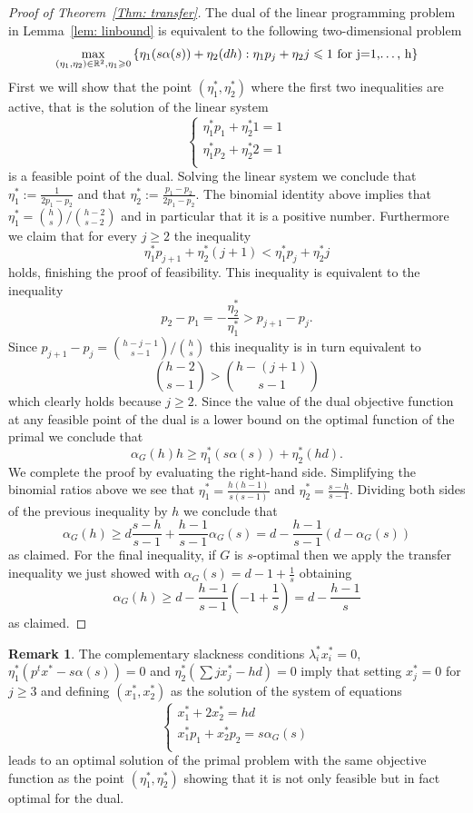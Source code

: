 \documentclass[12pt]{amsart}
\theoremstyle{definition}
\newtheorem{remark}[lemma]{Remark}
\renewcommand{\geq}{\geqslant}
\renewcommand{\leq}{\leqslant}
\newcommand{\RR}{\ensuremath{\mathbb{R}}}
\newcommand{\1}{\ensuremath{\mathbb{1}}}
\begin{document}
\begin{proof}[Proof of Theorem~\ref{Thm: transfer}] The dual of the linear programming problem in Lemma~\ref{lem: linbound} is equivalent to the following two-dimensional problem
\[\max_{(\eta_1,\eta_2)\in \RR^2, \eta_1\geq 0}\left\{ \eta_1(s\alpha(s))+\eta_2(dh) : \eta_1p_j+\eta_2j\leq 1\text{ for j=1,\dots, h}\right\}\] 
First we will show that the point $(\eta_1^*,\eta_2^*)$ where the first two inequalities are active, that is the solution of the linear system
\[ 
\begin{cases}
\eta_1^*p_1+\eta_2^*1 = 1 \\
\eta_1^*p_2+\eta_2^*2 = 1 \\
\end{cases}\]
is a feasible point of the dual. Solving the linear system we conclude that $\eta_1^*:=\frac{1}{2p_1-p_2}$ and that $\eta_2^*:=\frac{p_1-p_2}{2p_1-p_2}$. The binomial identity above implies that $\eta_1^* = \binom{h}{s}/\binom{h-2}{s-2}$ and in particular that it is a positive number. Furthermore we claim that for every $j\geq 2$ the inequality 
\[\eta_1^*p_{j+1}+\eta_2^*(j+1) < \eta_1^*p_{j}+\eta_2^*j\]
holds, finishing the proof of feasibility.
This inequality is equivalent to the inequality 
\[p_2-p_1 = -\frac{\eta_2^*}{\eta_1^*} > p_{j+1}-p_j.\]
Since $p_{j+1}-p_{j} = \binom{h-j-1}{s-1}/\binom{h}{s}$ this inequality is in turn equivalent to 
\[\binom{h-2}{s-1} > \binom{h-(j+1)}{s-1}\]
which clearly holds because $j\geq 2$. Since the value of the dual objective function at any feasible point of the dual is a lower bound on the optimal function of the primal we conclude that 
\[\alpha_G(h)h\geq \eta_1^*(s\alpha(s))+\eta_2^*(hd).\]
We complete the proof by evaluating the right-hand side. Simplifying the binomial ratios above we see that $\eta_1^*=\frac{h(h-1)}{s(s-1)}$ and $\eta_2^*=\frac{s-h}{s-1}$. Dividing both sides of the previous inequality by $h$ we conclude that
\[\alpha_G(h)\geq d\frac{s-h}{s-1}+\frac{h-1}{s-1}\alpha_G(s)=d-\frac{h-1}{s-1}\left(d-\alpha_G(s)\right)\]
as claimed.
For the final inequality, if $G$ is $s$-optimal then we apply the transfer inequality we just showed with $\alpha_G(s)=d-1+\frac{1}{s}$ obtaining 
\[\alpha_G(h)\geq d-\frac{h-1}{s-1}\left(-1+\frac{1}{s}\right) = d-\frac{h-1}{s}\]
as claimed.
\end{proof}

\begin{remark} The complementary slackness conditions $\lambda_i^*x_i^*=0$, $\eta_1^*(p^t x^*-s\alpha(s))=0$ and $\eta_2^*\left(\sum jx_j^*-hd\right)=0$ imply that setting $x_j^*=0$ for $j\geq 3$ and defining $(x_1^*,x_2^*)$ as the solution of the system of equations 
\[ 
\begin{cases}
x_1^*+2x_2^* = hd \\
x_1^*p_1+x_2^*p_2 = s\alpha_G(s) \\
\end{cases}\]
leads to an optimal solution of the primal problem with the same objective function as the point $(\eta_1^*,\eta_2^*)$ showing that it is not only feasible but in fact optimal for the dual.
\end{remark}
\end{document}
